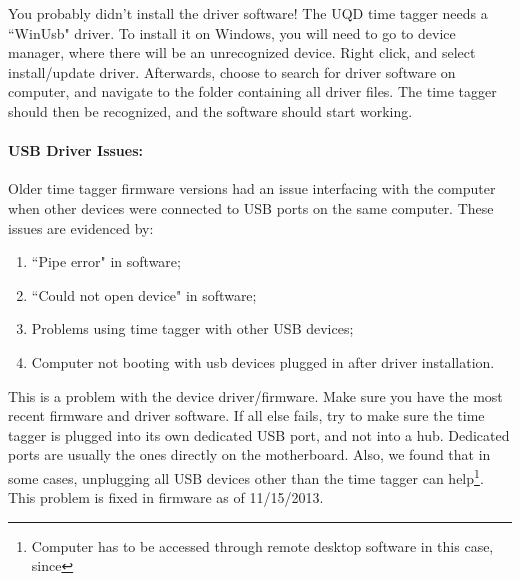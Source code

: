\documentclass[10pt]{article}
\begin{document}
You probably didn't install the driver software! The UQD time tagger needs a ``WinUsb" driver. To install it on Windows,
you will need to go to device manager, where there will be an unrecognized device. Right click, and select install/update
driver. Afterwards, choose to search for driver software on computer, and navigate to the folder containing all driver files.
The time tagger should then be recognized, and the software should start working.


\paragraph{USB Driver Issues:}


Older time tagger firmware versions had an issue interfacing with the computer when other devices were connected to USB ports
on the same computer. 
These issues are evidenced by:
\begin{enumerate}
\item ``Pipe error" in software;
\item ``Could not open device" in software;
\item Problems using time tagger with other USB devices;
\item Computer not booting with usb devices plugged in after driver installation.
\end{enumerate}
This is a problem with the device driver/firmware. Make sure you have the most recent firmware and driver software.
If all else fails, try to make sure the time tagger is plugged into its own dedicated USB port, and not into a hub. 
Dedicated ports are usually the ones directly on the motherboard. Also, we found that in some cases, unplugging all
USB devices other than the time tagger can help\footnote{Computer has to be accessed through remote desktop software in this case,
since }. This problem is fixed in firmware as of 11/15/2013.
\end{document}
